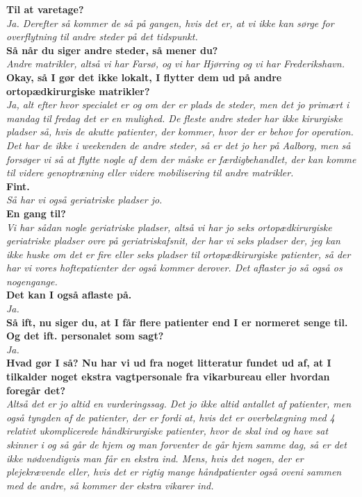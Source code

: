 \noindent
\textbf{Til at varetage?} \\
\noindent
\textit{Ja. Derefter så kommer de så på gangen, hvis det er, at vi ikke kan sørge for overflytning til andre steder på det tidspunkt.} \\
\noindent
\textbf{Så når du siger andre steder, så mener du?} \\
\noindent
\textit{Andre matrikler, altså vi har Farsø, og vi har Hjørring og vi har Frederikshavn.} \\
\noindent
\textbf{Okay, så I gør det ikke lokalt, I flytter dem ud på andre ortopædkirurgiske matrikler?} \\
\noindent
\textit{Ja, alt efter hvor specialet er og om der er plads de steder, men det jo primært i  mandag til fredag det er en mulighed. De fleste andre steder har ikke kirurgiske pladser så, hvis de akutte patienter, der kommer, hvor der er behov for operation. Det har de ikke i weekenden de andre steder, så er det jo her på Aalborg, men så forsøger vi så at flytte nogle af dem der måske er færdigbehandlet, der kan komme til videre genoptræning eller videre mobilisering til andre matrikler. } \\
\noindent
\textbf{Fint.} \\
\noindent
\textit{Så har vi også geriatriske pladser jo.} \\
\noindent
\textbf{En gang til?} \\
\noindent
\textit{Vi har sådan nogle geriatriske pladser, altså vi har jo seks ortopædkirurgiske geriatriske pladser ovre på geriatriskafsnit, der har vi seks pladser der, jeg kan ikke huske om det er fire eller seks pladser til ortopædkirurgiske patienter, så der har vi vores hoftepatienter der også kommer derover. Det aflaster jo så også os nogengange.} \\
\noindent
\textbf{Det kan I også aflaste på.} \\
\noindent
\textit{Ja.} \\
\noindent
\textbf{Så ift, nu siger du, at I får flere patienter end I er normeret senge til. Og det ift. personalet som sagt?} \\
\noindent
\textit{Ja.} \\
\noindent
\textbf{Hvad gør I så? Nu har vi ud fra noget litteratur fundet ud af, at I tilkalder noget ekstra vagtpersonale fra vikarbureau eller hvordan foregår det?} \\
\noindent
\textit{Altså det er jo altid en vurderingssag. Det jo ikke altid antallet af patienter, men også tyngden af de patienter, der er fordi at, hvis det er overbelægning med 4 relativt ukomplicerede håndkirurgiske patienter, hvor de skal ind og have sat skinner i og så går de hjem og man forventer de går hjem samme dag, så er det ikke nødvendigvis man får en ekstra ind. Mens, hvis det nogen, der er plejekrævende eller, hvis det er rigtig mange håndpatienter også oveni sammen med de andre, så kommer der ekstra vikarer ind.}\\
